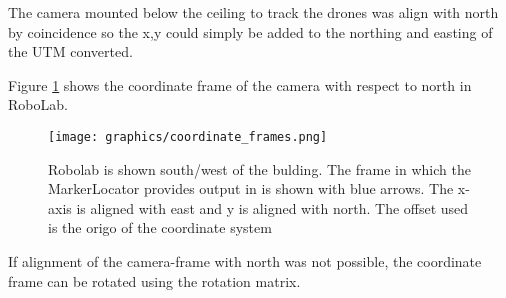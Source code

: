 The camera mounted below the ceiling to track the drones was align with north by coincidence so the x,y could simply be added to the northing and easting of the \ac{UTM} converted.

Figure \ref{fig:coordinate_frames} shows the coordinate frame of the camera with respect to north in RoboLab.

\begin{figure}[H]
    \center
    \texttt{[image: graphics/coordinate\_frames.png]}
  	\caption{Robolab is shown south/west of the bulding. The frame in which the MarkerLocator provides output in is shown with blue arrows. The x-axis is aligned with east and y is aligned with north. The offset used is the origo of the coordinate system}
    \label{fig:coordinate_frames}
\end{figure}

If alignment of the camera-frame with north was not possible, the coordinate frame can be rotated using the rotation matrix\cite{ROB5 bog}.